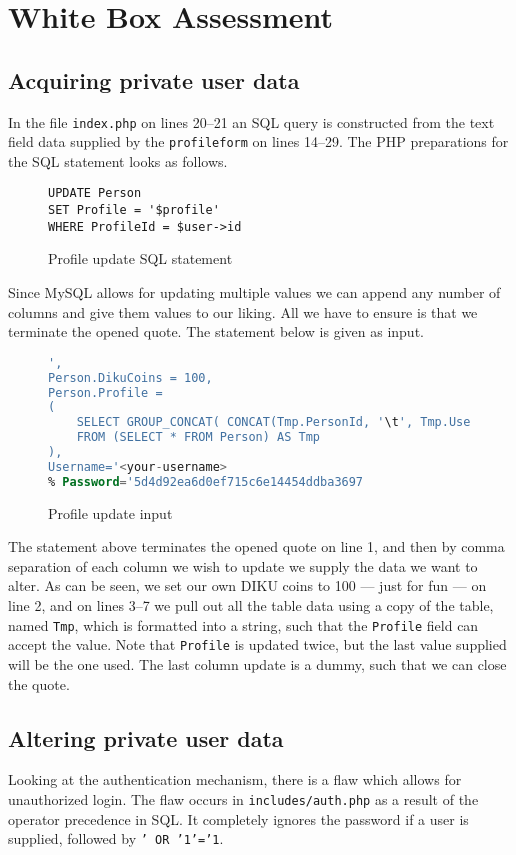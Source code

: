 \documentclass[11pt,a4paper]{article}
\newcommand{\code}[1]{{\tt #1}}
\newcommand{\file}[1]{{\tt #1}}
\begin{document}
\newpage
\section{White Box Assessment}

\subsection{Acquiring private user data}
\label{sec:white|sub:acquire}
In the file \file{index.php} on lines 20--21 an SQL query is constructed from
the text field data supplied by the \code{profileform} on lines 14--29. The
PHP preparations for the SQL statement looks as follows.
\begin{figure}[H]
    \begin{lstlisting}
UPDATE Person
SET Profile = '$profile'
WHERE ProfileId = $user->id
    \end{lstlisting}
    \caption{Profile update SQL statement}
\end{figure}
Since MySQL allows for updating multiple values we can append any number of
columns and give them values to our liking. All we have to ensure is that we
terminate the opened quote. The statement below is given as input.

\begin{figure}[H]
    \begin{lstlisting}[language=SQL]
',
Person.DikuCoins = 100,
Person.Profile =
(
    SELECT GROUP_CONCAT( CONCAT(Tmp.PersonId, '\t', Tmp.Username, '\t', Tmp.Salt, '\t', Tmp.DikuCoins) SEPARATOR '\n')
    FROM (SELECT * FROM Person) AS Tmp
),
Username='<your-username>
% Password='5d4d92ea6d0ef715c6e14454ddba3697
    \end{lstlisting}
    \caption{Profile update input}
\end{figure}

The statement above terminates the opened quote on line 1, and then by comma
separation of each column we wish to update we supply the data we want to
alter. As can be seen, we set our own DIKU coins to 100 --- just for fun ---
on line 2, and on lines 3--7 we pull out all the table data using a copy of
the table, named \code{Tmp}, which is formatted into a string, such that the
\code{Profile} field can accept the value. Note that \code{Profile} is updated
twice, but the last value supplied will be the one used. The last column
update is a dummy, such that we can close the quote.

\subsection{Altering private user data}
Looking at the authentication mechanism, there is a flaw which allows for
unauthorized login. The flaw occurs in \file{includes/auth.php} as a result of
the operator precedence in SQL. It completely ignores the password if a user
is supplied, followed by \code{' OR '1'='1}.
\end{document}
